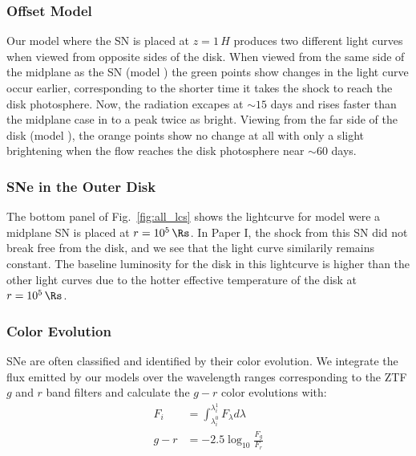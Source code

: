 \subsubsection{Offset Model}

Our model where the SN is placed at $z=1\,H$ produces two different light curves when viewed from opposite sides of the disk.
When viewed from the same side of the midplane as the SN (model ) the green points show changes in the light curve occur earlier, corresponding to the shorter time it takes the shock to reach the disk photosphere.
Now, the radiation excapes at $\sim15$ days and rises faster than the midplane case in  to a peak twice as bright.
Viewing from the far side of the disk (model ), the orange points show no change at all with only a slight brightening when the flow reaches the disk photosphere near $\sim60$ days.

\subsubsection{SNe in the Outer Disk}

The bottom panel of Fig.~\ref{fig:all_lcs} shows the lightcurve for model  were a midplane SN is placed at $r=10^5\,\Rs$.
In Paper I, the shock from this SN did not break free from the disk, and we see that the light curve similarily remains constant.
The baseline luminosity for the disk in this lightcurve is higher than the other light curves due to the hotter effective temperature of the disk at $r=10^5\,\Rs$. 



\subsubsection{Color Evolution}
SNe are often classified and identified by their color evolution.
We integrate the flux emitted by our models over the wavelength ranges corresponding to the ZTF $g$ and $r$ band filters and calculate the $g-r$ color evolutions with:
\begin{align}
	F_{i} &= \int_{\lambda_{i}^0} ^{\lambda_{i}^1} F_\lambda d\lambda \\
	g-r     &= -2.5\log_{10}\frac{F_g}{F_r}
\end{align}

